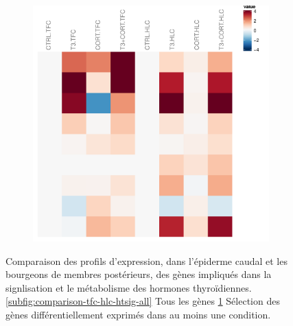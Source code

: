 \begin{figure}[!htbp]
\begin{subfigure}{0.45\textwidth}
	\includegraphics[width=\textwidth]
	{Figures/comparison-tfc-hlc-htsig/comparison-tfc-hlc-htsig-de.pdf}
	\caption{}
	\label{subfig:comparison-tfc-hlc-htsig-de}
\end{subfigure}
\caption[Profils d'expression des gènes impliqués dans la signlisation et le métabolisme des hormones thyroïdiennes]
{
Comparaison des profils d'expression, dans l'épiderme caudal et les bourgeons de membres postérieurs, des gènes impliqués dans la signlisation et le métabolisme des hormones thyroïdiennes.
\ref{subfig:comparison-tfc-hlc-htsig-all} Tous les gènes
\ref{subfig:comparison-tfc-hlc-htsig-de} Sélection des gènes différentiellement exprimés dans au moins une condition.
}
\label{fig:comparison-tfc-hlc-htsig}
%
\end{figure}
%
